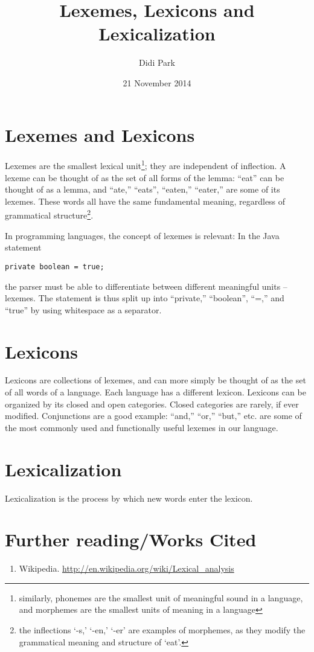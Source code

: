 \documentclass[11pt]{article}
\title{Lexemes, Lexicons and Lexicalization}
\author{Didi Park}
\date{21 November 2014}
\begin{document}
\maketitle

\section{Lexemes and Lexicons}
Lexemes are the smallest lexical unit\footnote{similarly, phonemes are the smallest unit of meaningful sound in a language, and morphemes are the smallest units of meaning in a language}; they are independent of inflection. A lexeme can be thought of as the set of all forms of the lemma: ``eat'' can be thought of as a lemma, and ``ate,'' ``eats'', ``eaten,'' ``eater,'' are some of its lexemes. These words all have the same fundamental meaning, regardless of grammatical structure\footnote{the inflections `-s,' `-en,' `-er' are examples of morphemes, as they modify the grammatical meaning and structure of `eat'.}.

In programming languages, the concept of lexemes is relevant: In the Java statement \begin{verbatim}private boolean = true;\end{verbatim} the parser must be able to differentiate between different meaningful units -- lexemes. The statement is thus split up into ``private,'' ``boolean'', ``=,'' and ``true'' by using whitespace as a separator.

\section{Lexicons}
Lexicons are collections of lexemes, and can more simply be thought of as the set of all words of a language. Each language has a different lexicon. Lexicons can be organized by its closed and open categories. Closed categories are rarely, if ever modified. Conjunctions are a good example: ``and,'' ``or,'' ``but,'' etc. are some of the most commonly used and functionally useful lexemes in our language. 

\section{Lexicalization}
Lexicalization is the process by which new words enter the lexicon.
\subsection{}
\section{Further reading/Works Cited}
\begin{enumerate}
\item Wikipedia. \url{http://en.wikipedia.org/wiki/Lexical_analysis}
\end{enumerate}
\end{document}
